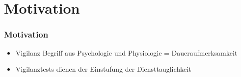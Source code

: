 \section{Motivation}
\begin{frame}
 \frametitle{Motivation}
	 \begin{itemize}
	 \item Vigilanz Begriff aus Psychologie und Physiologie = Daueraufmerksamkeit
	 \item Vigilanztests dienen der Einstufung der Diensttauglichkeit
	 
	 \end{itemize}
\end{frame}